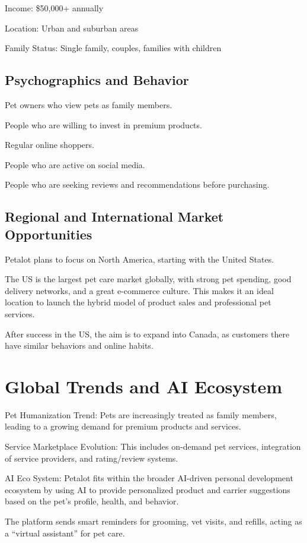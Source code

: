 \documentclass[11pt,a4paper]{article}
\begin{document}
Income: \$50,000+ annually 

Location: Urban and suburban areas 

Family Status: Single family, couples, families with children 

\subsection{Psychographics and Behavior}
Pet owners who view pets as family members.

People who are willing to invest in premium products.

Regular online shoppers.

People who are active on social media.

People who are seeking reviews and recommendations before purchasing.

\subsection{Regional and International Market Opportunities}
Petalot plans to focus on North America, starting with the United States.

The US is the largest pet care market globally, with strong pet spending, good delivery networks, and a great e-commerce culture. This makes it an ideal location to launch the hybrid model of product sales and professional pet services.

After success in the US, the aim is to expand into Canada, as customers there have similar behaviors and online habits.

\section{Global Trends and AI Ecosystem}

Pet Humanization Trend: Pets are increasingly treated as family members, leading to a growing demand for premium products and services.

Service Marketplace Evolution: This includes on-demand pet services, integration of service providers, and rating/review systems.

AI Eco System: Petalot fits within the broader AI-driven personal development ecosystem by using AI to provide personalized product and carrier suggestions based on the pet's profile, health, and behavior.

The platform sends smart reminders for grooming, vet visits, and refills, acting as a ``virtual assistant'' for pet care.
\end{document}
